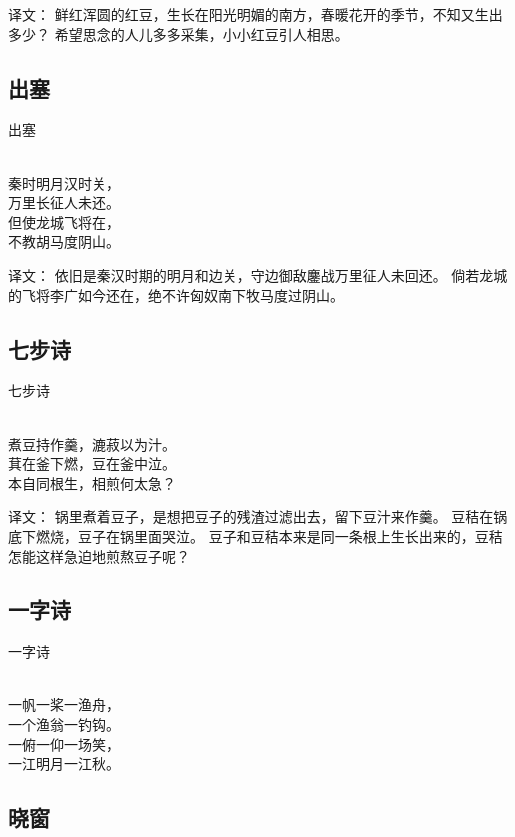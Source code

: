 译文：
鲜红浑圆的红豆，生长在阳光明媚的南方，春暖花开的季节，不知又生出多少？
希望思念的人儿多多采集，小小红豆引人相思。

\subsection{出塞}

\noindent 出塞

  \\

\noindent 秦时明月汉时关，\\万里长征人未还。\\
但使龙城飞将在，\\不教胡马度阴山。

译文：
依旧是秦汉时期的明月和边关，守边御敌鏖战万里征人未回还。
倘若龙城的飞将李广如今还在，绝不许匈奴南下牧马度过阴山。

\subsection{七步诗}

\noindent 七步诗

  \\

\noindent 煮豆持作羹，漉菽以为汁。\\
萁在釜下燃，豆在釜中泣。\\
本自同根生，相煎何太急？

译文：
锅里煮着豆子，是想把豆子的残渣过滤出去，留下豆汁来作羹。
豆秸在锅底下燃烧，豆子在锅里面哭泣。
豆子和豆秸本来是同一条根上生长出来的，豆秸怎能这样急迫地煎熬豆子呢？

\subsection{一字诗}

\noindent 一字诗

  \\

\noindent 一帆一桨一渔舟，\\
一个渔翁一钓钩。\\
一俯一仰一场笑，\\
一江明月一江秋。

\subsection{晓窗}

